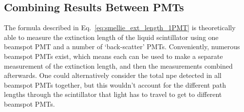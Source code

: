 \begin{figure}
    \centering
    \caption[]{}
    \label{fig:t2_temm_comparison}
\end{figure}


\subsection{Combining Results Between PMTs}
The formula described in Eq.~\ref{eq:smellie_ext_length_1PMT} is theoretically able to measure the extinction length of the liquid scintillator using one beamspot PMT and a number of `back-scatter' PMTs. Conveniently, numerous beamspot PMTs exist, which means each can be used to make a separate measurement of the extinction length, and then the measurements combined afterwards. One could alternatively consider the total npe detected in all beamspot PMTs together, but this wouldn't account for the different path lengths through the scintillator that light has to travel to get to different beamspot PMTs.



